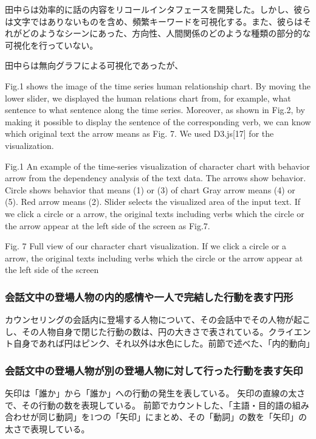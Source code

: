 \documentclass[shuuron]{kuee}
\begin{document}
田中ら\cite{tanaka}は効率的に話の内容をリコールインタフェースを開発した。しかし、彼らは文字ではありないものを含め、頻繁キーワードを可視化する。また、彼らはそれがどのようなシーンにあった、方向性、人間関係のどのような種類の部分的な可視化を行っていない。

田中らは無向グラフによる可視化であったが、

  Fig.1 shows the image of the time series human relationship chart. By moving the lower slider, we displayed the human relations chart from, for example, what sentence to what sentence along the time series. Moreover, as shown in Fig.2, by making it possible to display the sentence of the corresponding verb, we can know which original text the arrow means as Fig. 7. We used D3.js[17] for the visualization.


Fig.1 An example of the time-series visualization of character chart with behavior arrow from the dependency analysis of the text data. The arrows show behavior. Circle shows behavior that means (1) or (3) of chart Gray arrow means (4) or (5). Red arrow means (2). Slider selects the visualized area of the input text. If we click a circle or a arrow, the original texts including verbs which the circle or the arrow appear at the left side of the screen as Fig.7.

Fig. 7 Full view of our character chart visualization. If we click a circle or a arrow, the original texts including verbs which the circle or the arrow appear at the left side of the screen

\subsubsection{会話文中の登場人物の内的感情や一人で完結した行動を表す円形}

カウンセリングの会話内に登場する人物について、その会話中でその人物が起こし、その人物自身で閉じた行動の数は、円の大きさで表されている。クライエント自身であれば円はピンク、それ以外は水色にした。前節で述べた、「内的動向」


\subsubsection{会話文中の登場人物が別の登場人物に対して行った行動を表す矢印}

矢印は「誰か」から「誰か」への行動の発生を表している。
矢印の直線の太さで、その行動の数を表現している。
前節でカウントした、「主語・目的語の組み合わせが同じ動詞」を1つの「矢印」にまとめ、その「動詞」の数を「矢印」の太さで表現している。
\end{document}
